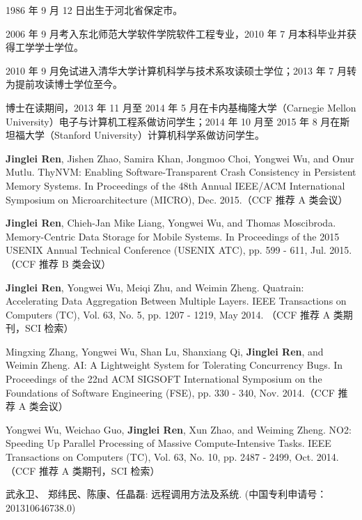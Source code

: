 \begin{resume}


  1986 年 9 月 12 日出生于河北省保定市。

  2006 年 9 月考入东北师范大学软件学院软件工程专业，2010 年 7 月本科毕业并获得工学学士学位。

  2010 年 9 月免试进入清华大学计算机科学与技术系攻读硕士学位；2013 年 7 月转为提前攻读博士学位至今。

  博士在读期间，2013 年 11 月至 2014 年 5 月在卡内基梅隆大学（Carnegie Mellon University）电子与计算机工程系做访问学生；2014 年 10 月至 2015 年 8 月在斯坦福大学（Stanford University）计算机科学系做访问学生。

  \begin{publications}
  \item \textbf{Jinglei Ren}, Jishen Zhao, Samira Khan, Jongmoo Choi, Yongwei Wu, and Onur Mutlu.
ThyNVM: Enabling Software-Transparent Crash Consistency in Persistent Memory Systems.
In Proceedings of the 48th Annual IEEE/ACM International Symposium on Microarchitecture (MICRO), Dec. 2015.（CCF 推荐 A 类会议）
  \item \textbf{Jinglei Ren}, Chieh-Jan Mike Liang, Yongwei Wu, and Thomas Moscibroda.
Memory-Centric Data Storage for Mobile Systems.
In Proceedings of the 2015 USENIX Annual Technical Conference (USENIX ATC), pp. 599 - 611, Jul. 2015.（CCF 推荐 B 类会议）
  \item \textbf{Jinglei Ren}, Yongwei Wu, Meiqi Zhu, and Weimin Zheng.
Quatrain: Accelerating Data Aggregation Between Multiple Layers.
IEEE Transactions on Computers (TC), Vol. 63, No. 5, pp. 1207 - 1219, May 2014. （CCF 推荐 A 类期刊，SCI 检索）
  \item Mingxing Zhang, Yongwei Wu, Shan Lu, Shanxiang Qi, \textbf{Jinglei Ren}, and Weimin Zheng.
AI: A Lightweight System for Tolerating Concurrency Bugs.
In Proceedings of the 22nd ACM SIGSOFT International Symposium on the Foundations of Software Engineering (FSE), pp. 330 - 340, Nov. 2014.（CCF 推荐 A 类会议）
  \item Yongwei Wu, Weichao Guo, \textbf{Jinglei Ren}, Xun Zhao, and Weiming Zheng.
NO2: Speeding Up Parallel Processing of Massive Compute-Intensive Tasks.
IEEE Transactions on Computers (TC), Vol. 63, No. 10, pp. 2487 - 2499, Oct. 2014.（CCF 推荐 A 类期刊，SCI 检索）
  \end{publications}

  \begin{achievements}
  \item 武永卫、 郑纬民、陈康、任晶磊: 远程调用方法及系统. (中国专利申请号：201310646738.0)
  \end{achievements}
\end{resume}

